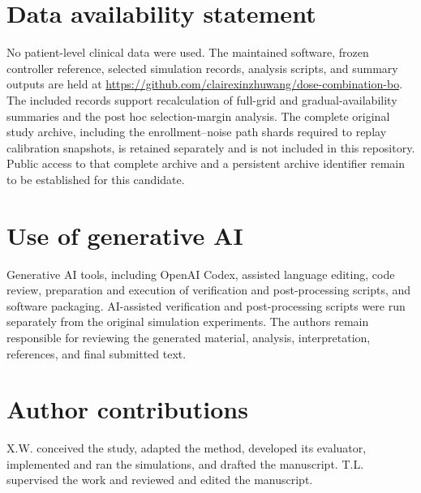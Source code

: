 \documentclass[11pt]{article}
\newcommand{\rev}[1]{{#1}}
\begin{document}
\section*{Data availability statement}
\rev{No patient-level clinical data were used. The maintained software, frozen controller reference, selected simulation records, analysis scripts, and summary outputs are held at \url{https://github.com/clairexinzhuwang/dose-combination-bo}. The included records support recalculation of full-grid and gradual-availability summaries and the post hoc selection-margin analysis. The complete original study archive, including the enrollment--noise path shards required to replay calibration snapshots, is retained separately and is not included in this repository. Public access to that complete archive and a persistent archive identifier remain to be established for this candidate.}

\section*{Use of generative AI}
Generative AI tools, including OpenAI Codex, assisted language editing, code review, \rev{preparation and execution of verification and post-processing scripts, and software packaging}. \rev{AI-assisted verification and post-processing scripts were run separately from the original simulation experiments.} The authors remain responsible for reviewing the generated material, analysis, interpretation, references, and final submitted text.

\section*{Author contributions}
X.W. conceived the study, adapted the method, developed its evaluator, implemented and ran the simulations, and drafted the manuscript. T.L. supervised the work and reviewed and edited the manuscript.
\end{document}
